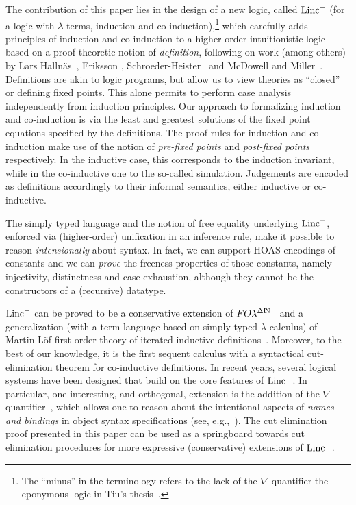 \documentclass[preprint]{elsarticle}
\newcommand{\FOL   }{FO\lambda}
\newcommand{\FOLDN }{\FOL^{\Delta\N}}
\newcommand{\Linc}{{\rm Linc}^-}
\newcommand{\N}{{\rm I} \! {\rm N}}
\begin{document}
The contribution of this paper lies in the design of a new logic,
called $\Linc$ (for a logic with $\lambda$-terms, induction and
co-induction),\footnote{The ``minus'' in the terminology refers to the
  lack of the $\nabla$-quantifier \wrt the eponymous logic in Tiu's
  thesis~\cite{tiu04phd}.} which carefully adds principles of
induction and co-induction to a higher-order intuitionistic logic
based on a proof theoretic notion of \emph{definition}, following on
work (among others) by Lars Halln{\"{a}}s~\cite{PID}, Eriksson
\cite{eriksson91elp}, Schroeder-Heister~\cite{schroeder-heister93lics}
and McDowell and Miller~\cite{mcdowell00tcs}.  Definitions are akin to
logic programs, but allow us to view theories as ``closed'' or
defining fixed points.  This alone permits to perform case analysis
independently from induction principles.  Our approach to formalizing
induction and co-induction is via the least and greatest solutions of
the fixed point equations specified by the definitions. 
The proof rules for induction and co-induction make use of the notion
of \emph{pre-fixed points} and \emph{post-fixed points}
respectively. In the inductive case, this corresponds to the induction
invariant, while in the co-inductive one to the so-called simulation.
Judgements are encoded as definitions accordingly to their informal
semantics, either inductive or co-inductive.


The simply typed language and the notion of free equality underlying
$\Linc$, enforced via (higher-order) unification in an inference rule,
make it possible to reason \emph{intensionally} about syntax.
In fact, we can support HOAS encodings of constants
and we can \emph{prove} the freeness properties of those constants,
namely injectivity, distinctness and case exhaustion, although they
cannot be the constructors of a (recursive)
datatype.  




$\Linc$ can be proved to be a conservative extension of
$\FOLDN$~\cite{mcdowell00tcs} and a generalization (with a term
language based on simply typed $\lambda$-calculus) of Martin-L\"of
first-order theory of iterated inductive
definitions~\cite{martin-lof71sls}. Moreover, to the best of our
knowledge, it is the first sequent calculus with a syntactical
cut-elimination theorem for co-inductive definitions.  In recent
years, several logical systems have been designed that build on the
core features of $\Linc$. In particular, one interesting, and
orthogonal, extension is the addition of the
$\nabla$-quantifier~\cite{miller05tocl,tiu04phd,Tiu07,gacek08lics},
which allows one to reason about the intentional aspects of
\emph{names and bindings} in object syntax specifications (see,
e.g.,~\cite{AbellaSOS,TiuMillerpi}).  The cut elimination
proof presented in this paper can be used as a springboard towards cut
elimination procedures for more expressive (conservative) extensions
of $\Linc$. 
\end{document}
